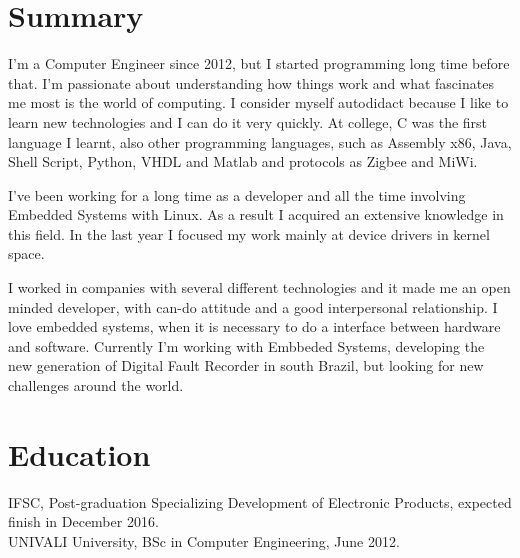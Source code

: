 \documentclass[margin]{res}
\begin{document}
\address{São José, BR \\ diogojusten@gmail.com \\ Phone: +55 (48) 9994-4758 }

\begin{resume}

\section{Summary}
I'm a Computer Engineer since 2012, but I started programming long time before that. I’m passionate about understanding how things work and what fascinates me most is
the world of computing. I consider myself autodidact because I like to learn new technologies and I can do it very quickly. At college, C was the first language I learnt, also other programming languages, such as Assembly x86, Java, Shell Script, Python, VHDL and Matlab and protocols as Zigbee and MiWi.

I've been working for a long time as a developer and all the time involving Embedded Systems with Linux. As a result I acquired an extensive knowledge in this field. In the last year I focused my work mainly at device drivers in kernel space. 

I worked in companies with several different technologies and it made me an open minded developer, with can-do attitude and a good interpersonal relationship. I love embedded systems, when it is necessary to do a interface between hardware and software. Currently I’m working with Embbeded Systems, developing the new generation of Digital Fault Recorder in south Brazil, but looking for new challenges around the world.

\section{Education}
 IFSC, Post-graduation Specializing Development of Electronic Products, expected finish in December 2016.\\
 UNIVALI University, BSc in Computer Engineering, June 2012.


\end{resume}
\end{document}
